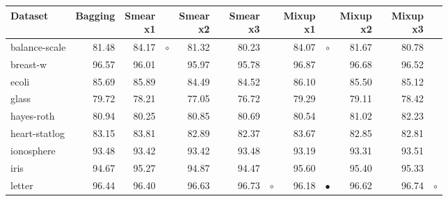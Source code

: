 \documentclass{article}
\begin{document}
\begin{table}[thb]
\footnotesize
{\centering \begin{tabular}{lrr@{\hspace{0.1cm}}cr@{\hspace{0.1cm}}cr@{\hspace{0.1cm}}cr@{\hspace{0.1cm}}cr@{\hspace{0.1cm}}cr@{\hspace{0.1cm}}c}
\\
\hline
Dataset & Bagging & \makecell{Smear \\ x1} & & \makecell{Smear \\ x2} & & \makecell{Smear \\ x3} & & \makecell{Mixup \\ x1} & & \makecell{Mixup \\ x2} & & \makecell{Mixup \\ x3} & \\
\hline
balance-scale & 81.48 & 84.17 &   $\circ$ & 81.32 &           & 80.23 &          & 84.07 &   $\circ$ & 81.67 &          & 80.78 &         \\
breast-w & 96.57 & 96.01 &           & 95.97 &           & 95.78 &          & 96.87 &           & 96.68 &          & 96.52 &         \\
ecoli & 85.69 & 85.89 &           & 84.49 &           & 84.52 &          & 86.10 &           & 85.50 &          & 85.12 &         \\
glass & 79.72 & 78.21 &           & 77.05 &           & 76.72 &          & 79.29 &           & 79.11 &          & 78.42 &         \\
hayes-roth & 80.94 & 80.25 &           & 80.85 &           & 80.69 &          & 80.54 &           & 81.02 &          & 82.23 &         \\
heart-statlog & 83.15 & 83.81 &           & 82.89 &           & 82.37 &          & 83.67 &           & 82.85 &          & 82.81 &         \\
ionosphere & 93.48 & 93.42 &           & 93.42 &           & 93.48 &          & 93.19 &           & 93.31 &          & 93.51 &         \\
iris & 94.67 & 95.27 &           & 94.87 &           & 94.47 &          & 95.60 &           & 95.40 &          & 95.33 &         \\
letter & 96.44 & 96.40 &           & 96.63 &           & 96.73 &  $\circ$ & 96.18 & $\bullet$ & 96.62 &          & 96.74 &  $\circ$\\

\end{tabular}}
\end{table}
\end{document}
